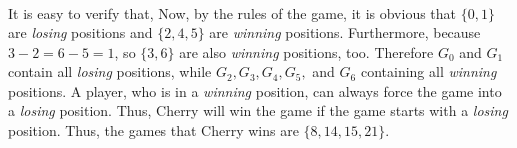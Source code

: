 \begin{multicols}{2}
\begin{align*}
	\end{align*}
	It is easy to verify that,
	\vskip 0.2cm
	\vskip 0.2cm
	Now, by the rules of the game, it is obvious that $\{0, 1\}$ are \textit{losing} positions and $\{2,4,5\}$ are \textit{winning} positions.
	Furthermore, because $3-2=6-5=1$, so $\{3,6\}$ are also \textit{winning} positions, too.
	\vskip 0.1cm
	Therefore $G_0$ and $G_1$ contain all \textit{losing} positions, while $G_2,G_3,G_4,G_5,$ and $G_6$ containing all \textit{winning} positions.
	A player, who is in a \textit{winning} position, can always force the game into a \textit{losing} position.
	Thus, Cherry will win the game if the game starts with a \textit{losing} position.
	Thus, the games that Cherry wins are $\{8,14,15,21\}$.
\end{multicols}
